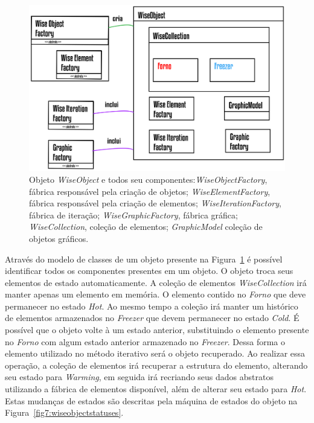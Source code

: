 \begin{figure}[!htbp]
	\centering
	\includegraphics[scale=1.15]{Figures/WiseObject@16x.png}
	\caption{Objeto \textit{WiseObject} e todos seu componentes:\textit{WiseObjectFactory}, fábrica responsável pela criação de objetos; \textit{WiseElementFactory}, fábrica responsável pela criação de elementos; \textit{WiseIterationFactory}, fábrica de iteração; \textit{WiseGraphicFactory}, fábrica gráfica; \textit{WiseCollection}, coleção de elementos; \textit{GraphicModel} coleção de objetos gráficos.}
	\label{fig7:wiseobject}
\end{figure}

Através do modelo de classes de um objeto presente na Figura~\ref{fig7:wiseobject} é possível identificar todos os componentes presentes em um objeto. O objeto troca seus elementos de estado automaticamente. A coleção de elementos \textit{WiseCollection} irá manter apenas um elemento em memória. O elemento contido no \textit{Forno} que deve permanecer no estado \textit{Hot}. Ao mesmo tempo a coleção irá manter um histórico de elementos armazenados no \textit{Freezer} que devem permanecer no estado \textit{Cold}. É possível que o objeto volte à um estado anterior, substituindo o elemento presente no \textit{Forno} com algum estado anterior armazenado no \textit{Freezer}. Dessa forma o elemento utilizado no método iterativo será o objeto recuperado. Ao realizar essa operação, a coleção de elementos irá recuperar a estrutura do elemento, alterando seu estado para \textit{Warming}, em seguida irá recriando seus dados abstratos utilizando a fábrica de elementos disponível, além de alterar seu estado para \textit{Hot}. Estas mudanças de estados são descritas pela máquina de estados do objeto na Figura~\ref{fig7:wiseobjectstatuses}.

